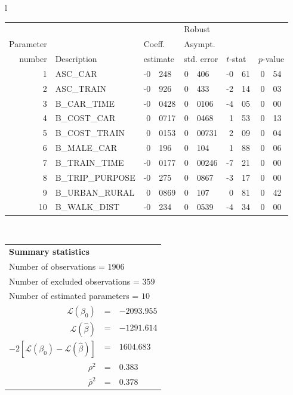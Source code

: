   \begin{tabular}{l}
\begin{tabular}{rlr@{.}lr@{.}lr@{.}lr@{.}l}
         &                       &   \multicolumn{2}{l}{}    & \multicolumn{2}{l}{Robust}  &     \multicolumn{4}{l}{}   \\
Parameter &                       &   \multicolumn{2}{l}{Coeff.}      & \multicolumn{2}{l}{Asympt.}  &     \multicolumn{4}{l}{}   \\
number &  Description                     &   \multicolumn{2}{l}{estimate}      & \multicolumn{2}{l}{std. error}  &   \multicolumn{2}{l}{$t$-stat}  &   \multicolumn{2}{l}{$p$-value}   \\

\hline

1 & ASC_CAR & -0&248 & 0&406 & -0&61 & 0&54\\
2 & ASC_TRAIN & -0&926 & 0&433 & -2&14 & 0&03\\
3 & B_CAR_TIME & -0&0428 & 0&0106 & -4&05 & 0&00\\
4 & B_COST_CAR & 0&0717 & 0&0468 & 1&53 & 0&13\\
5 & B_COST_TRAIN & 0&0153 & 0&00731 & 2&09 & 0&04\\
6 & B_MALE_CAR & 0&196 & 0&104 & 1&88 & 0&06\\
7 & B_TRAIN_TIME & -0&0177 & 0&00246 & -7&21 & 0&00\\
8 & B_TRIP_PURPOSE & -0&275 & 0&0867 & -3&17 & 0&00\\
9 & B_URBAN_RURAL & 0&0869 & 0&107 & 0&81 & 0&42\\
10 & B_WALK_DIST & -0&234 & 0&0539 & -4&34 & 0&00\\
\hline
\end{tabular}
\\
\begin{tabular}{rcl}
\multicolumn{3}{l}{\bf Summary statistics}\\
\multicolumn{3}{l}{ Number of observations = $1906$} \\
\multicolumn{3}{l}{ Number of excluded observations = $359$} \\
\multicolumn{3}{l}{ Number of estimated  parameters = $10$} \\
 $\mathcal{L}(\beta_0)$ &=&  $-2093.955$ \\
 $\mathcal{L}(\hat{\beta})$ &=& $-1291.614 $  \\
 $-2[\mathcal{L}(\beta_0) -\mathcal{L}(\hat{\beta})]$ &=& $1604.683$ \\
    $\rho^2$ &=&   $0.383$ \\
    $\bar{\rho}^2$ &=&    $0.378$ \\
\end{tabular}
  \end{tabular}
